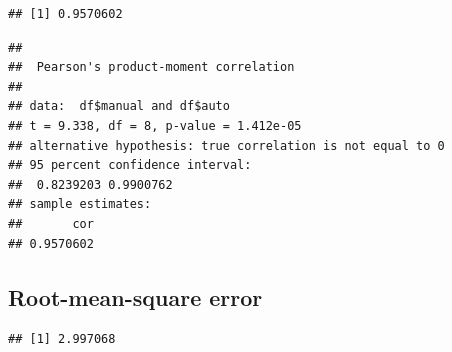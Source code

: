 \documentclass[
]{article}
\newenvironment{Shaded}{\begin{snugshade}}{\end{snugshade}}
\newcommand{\DecValTok}[1]{\textcolor[rgb]{0.00,0.00,0.81}{#1}}
\newcommand{\FloatTok}[1]{\textcolor[rgb]{0.00,0.00,0.81}{#1}}
\newcommand{\KeywordTok}[1]{\textcolor[rgb]{0.13,0.29,0.53}{\textbf{#1}}}
\newcommand{\NormalTok}[1]{#1}
\newcommand{\OperatorTok}[1]{\textcolor[rgb]{0.81,0.36,0.00}{\textbf{#1}}}
\newcommand{\StringTok}[1]{\textcolor[rgb]{0.31,0.60,0.02}{#1}}
\begin{document}
\begin{Shaded}
\end{Shaded}

\begin{verbatim}
## [1] 0.9570602
\end{verbatim}

\begin{Shaded}
\end{Shaded}

\begin{verbatim}
## 
##  Pearson's product-moment correlation
## 
## data:  df$manual and df$auto
## t = 9.338, df = 8, p-value = 1.412e-05
## alternative hypothesis: true correlation is not equal to 0
## 95 percent confidence interval:
##  0.8239203 0.9900762
## sample estimates:
##       cor 
## 0.9570602
\end{verbatim}

\hypertarget{root-mean-square-error-1}{%
\subsection{Root-mean-square error}\label{root-mean-square-error-1}}

\begin{Shaded}
\end{Shaded}

\begin{verbatim}
## [1] 2.997068
\end{verbatim}
\end{document}

